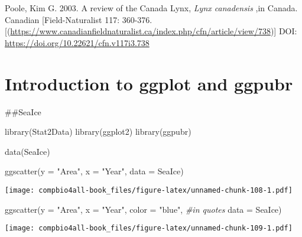 \documentclass[
]{book}
\newenvironment{Shaded}{\begin{snugshade}}{\end{snugshade}}
\newcommand{\AttributeTok}[1]{\textcolor[rgb]{0.77,0.63,0.00}{#1}}
\newcommand{\CommentTok}[1]{\textcolor[rgb]{0.56,0.35,0.01}{\textit{#1}}}
\newcommand{\FunctionTok}[1]{\textcolor[rgb]{0.00,0.00,0.00}{#1}}
\newcommand{\NormalTok}[1]{#1}
\newcommand{\StringTok}[1]{\textcolor[rgb]{0.31,0.60,0.02}{#1}}
\begin{document}
Poole, Kim G. 2003. A review of the Canada Lynx, \emph{Lynx canadensis} ,in Canada. Canadian {[}Field-Naturalist 117: 360-376.{[}(\url{https://www.canadianfieldnaturalist.ca/index.php/cfn/article/view/738}){]} DOI: \url{https://doi.org/10.22621/cfn.v117i3.738}

\hypertarget{introduction-to-ggplot-and-ggpubr}{%
\chapter{Introduction to ggplot and ggpubr}\label{introduction-to-ggplot-and-ggpubr}}

\#\#SeaIce

\begin{Shaded}
\begin{Highlighting}[]
\FunctionTok{library}\NormalTok{(Stat2Data)}
\FunctionTok{library}\NormalTok{(ggplot2)}
\FunctionTok{library}\NormalTok{(ggpubr)}
\end{Highlighting}
\end{Shaded}

\begin{Shaded}
\begin{Highlighting}[]
\FunctionTok{data}\NormalTok{(SeaIce)}
\end{Highlighting}
\end{Shaded}

\begin{Shaded}
\begin{Highlighting}[]
\FunctionTok{ggscatter}\NormalTok{(}\AttributeTok{y =} \StringTok{"Area"}\NormalTok{,}
          \AttributeTok{x =} \StringTok{"Year"}\NormalTok{,}
          \AttributeTok{data =}\NormalTok{ SeaIce)}
\end{Highlighting}
\end{Shaded}

\texttt{[image: compbio4all-book\_files/figure-latex/unnamed-chunk-108-1.pdf]}

\begin{Shaded}
\begin{Highlighting}[]
\FunctionTok{ggscatter}\NormalTok{(}\AttributeTok{y =} \StringTok{"Area"}\NormalTok{,}
          \AttributeTok{x =} \StringTok{"Year"}\NormalTok{,}
          \AttributeTok{color =} \StringTok{"blue"}\NormalTok{, }\CommentTok{\#in quotes}
          \AttributeTok{data =}\NormalTok{ SeaIce)}
\end{Highlighting}
\end{Shaded}

\texttt{[image: compbio4all-book\_files/figure-latex/unnamed-chunk-109-1.pdf]}
\end{document}
